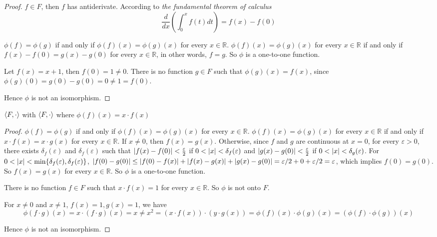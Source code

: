 \begin{proof}
    $f\in F$, then $f$ has antiderivate. According to \textit{the fundamental theorem of calculus}
    \[
        \frac{d}{dx}\left(\int^{x}_{0}f(t)dt\right) = f(x) - f(0)
    \]

    $\phi(f) = \phi(g)$ if and only if $\phi(f)(x) = \phi(g)(x)$ for every $x\in\mathbb{R}$. $\phi(f)(x) = \phi(g)(x)$ for every $x\in\mathbb{R}$ if and only if $f(x) - f(0) = g(x) - g(0)$ for every $x\in\mathbb{R}$, in other words, $f = g$. So $\phi$ is a one-to-one function.

    Let $f(x) = x + 1$, then $f(0) = 1\ne 0$. There is no function $g\in F$ such that $\phi(g)(x) = f(x)$, since $\phi(g)(0) = g(0) - g(0) = 0 \ne 1 = f(0)$.

    Hence $\phi$ is not an isomorphism.
\end{proof}

\begin{exercise}
    $\left\langle{F,\cdot}\right\rangle$ with $\left\langle{F,\cdot}\right\rangle$ where $\phi(f)(x) = x\cdot f(x)$
\end{exercise}

\begin{proof}
    $\phi(f) = \phi(g)$ if and only if $\phi(f)(x) = \phi(g)(x)$ for every $x\in\mathbb{R}$. $\phi(f)(x) = \phi(g)(x)$ for every $x\in\mathbb{R}$ if and only if $x\cdot f(x) = x\cdot g(x)$ for every $x\in\mathbb{R}$. If $x\ne 0$, then $f(x) = g(x)$. Otherwise, since $f$ and $g$ are continuous at $x = 0$, for every $\varepsilon > 0$, there exists $\delta_{f}(\varepsilon)$ and $\delta_{f}(\varepsilon)$ such that $\left\vert{f(x) - f(0)}\right\vert < \frac{\varepsilon}{2}$ if $0 < \left\vert{x}\right\vert < \delta_{f}(\varepsilon)$ and $\left\vert{g(x) - g(0)}\right\vert < \frac{\varepsilon}{2}$ if $0 < \left\vert{x}\right\vert < \delta_{g}(\varepsilon)$. For $0 < \left\vert{x}\right\vert < \min\{ \delta_{f}(\varepsilon), \delta_{f}(\varepsilon) \}$, $\left\vert{f(0) - g(0)}\right\vert\le \left\vert{f(0) - f(x)}\right\vert + \left\vert{f(x) - g(x)}\right\vert + \left\vert{g(x) - g(0)}\right\vert = \varepsilon/2 + 0 + \varepsilon/2 = \varepsilon$, which implies $f(0) = g(0)$. So $f(x) = g(x)$ for every $x\in\mathbb{R}$. So $\phi$ is a one-to-one function.

    There is no function $f\in F$ such that $x\cdot f(x) = 1$ for every $x\in\mathbb{R}$. So $\phi$ is not onto $F$.

    For $x\ne 0$ and $x\ne 1$, $f(x) = 1, g(x) = 1$, we have
    \[
        \phi(f\cdot g)(x) = x\cdot (f\cdot g)(x) = x \ne x^{2} = (x\cdot f(x))\cdot (y\cdot g(x)) = \phi(f)(x) \cdot \phi(g)(x) = (\phi(f)\cdot\phi(g))(x)
    \]

    Hence $\phi$ is not an isomorphism.
\end{proof}

